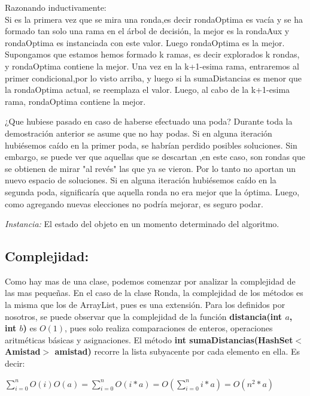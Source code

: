 \documentclass[10pt, a4paper]{article}
\begin{document}
Razonando inductivamente:\\
Si es la primera vez que se mira una ronda,es decir rondaOptima es vacía y se ha formado tan solo una rama en el árbol de decisión, la mejor es la rondaAux y rondaOptima es instanciada con este valor. Luego rondaOptima es la mejor.
Supongamos que estamos hemos formado k ramas, es decir explorados k rondas, y rondaOptima contiene la mejor. Una vez en la k+1-esima rama, entraremos al primer condicional,por lo visto arriba, y luego si la sumaDistancias es menor que la rondaOptima actual, se reemplaza el valor. Luego, al cabo de la k+1-esima rama, rondaOptima contiene la mejor.


¿Que hubiese pasado en caso de haberse efectuado una poda?
Durante toda la demostración anterior se asume que no hay podas.
Si en alguna iteración hubiésemos caído en la primer poda, se habrían perdido posibles soluciones. Sin embargo, se puede ver que aquellas que se descartan ,en este caso, son rondas que se obtienen de mirar "al revés" las que ya se vieron. Por lo tanto no aportan un nuevo espacio de soluciones.
Si en alguna iteración hubiésemos caído en la segunda poda, significaría que aquella ronda no era mejor que la óptima. Luego, como agregando nuevas elecciones no podría mejorar, es seguro podar.

\textit{Instancia:} El estado del objeto en un momento determinado del algoritmo.
\subsection{Complejidad:}

Como hay mas de una clase, podemos comenzar por analizar la complejidad de las mas pequeñas.
En el caso de la clase Ronda, la complejidad de los métodos es la misma que los de ArrayList, pues es una extensión. 
Para los definidos por nosotros, se puede observar que la complejidad de la función \textbf{distancia(int $a$, int $b$)} es $O(1)$, pues solo realiza comparaciones de enteros, operaciones aritméticas básicas y asignaciones.
El método  \textbf{int  sumaDistancias(HashSet$<$Amistad$>$ amistad)} recorre la lista subyacente por cada elemento en ella. Es decir:

\hspace{30mm}$\sum\limits_{i=0}^n O(i)O(a) =  \sum\limits_{i=0}^n O(i*a) = O(\sum\limits_{i=0}^n i*a) = O(n^2*a)$ 
\end{document}
